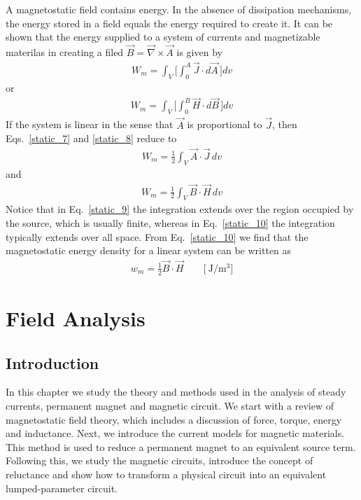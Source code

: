 \documentclass[11pt,a4paper,oneside]{book}
\numberwithin{equation}{section}
\theoremstyle{it}
\theoremstyle{definition}
\begin{document}
A magnetostatic field contains energy. In the absence of dissipation mechanisms, the energy stored in a field equals the energy required to create it. It can be shown that the energy supplied to a system of currents and magnetizable materilas in creating a filed $\vec{B}=\vec{\nabla}\times\vec{A}$ is given by 
 \begin{equation}\label{static_7}
 	\begin{aligned}
		W_m =\int_{V}\Bigg[\int_{0}^{A}\vec{J}\cdot d\vec{A}\,\Bigg]dv
 	\end{aligned}
 \end{equation} 
or
 \begin{equation}\label{static_8}
	\begin{aligned}
		W_m =\int_{V}\Bigg[\int_{0}^{B}\vec{H}\cdot d\vec{B}\,\Bigg]dv
	\end{aligned}
\end{equation} 
If the system is linear in the sense that $\vec{A}$ is proportional to $\vec{J}$, then Eqs.~\eqref{static_7} and \ref{static_8} reduce to
 \begin{equation}\label{static_9}
	\begin{aligned}
		W_m =\frac{1}{2}\int_{V}\vec{A}\cdot \vec{J}\,dv
	\end{aligned}
\end{equation} 
and
 \begin{equation}\label{static_10}
	\begin{aligned}
		W_m =\frac{1}{2}\int_{V}\vec{B}\cdot \vec{H}\,dv
	\end{aligned}
\end{equation} 
Notice that in Eq.~\eqref{static_9} the integration extends over the region occupied by the source, which is usually finite, whereas in Eq.~\eqref{static_10} the integration typically extends over all space. From Eq.~\eqref{static_10} we find that the magnetostatic energy density for a linear system can be written as
\begin{equation}\label{static_11}
	\begin{aligned}
		w_m =\frac{1}{2}\vec{B}\cdot \vec{H}\qquad\Big[\SI{}{\joule\per\cubic\meter}\Big]
	\end{aligned}
\end{equation} 

\chapter{Field Analysis}
\section{Introduction}
In this chapter we study the theory and methods used in the analysis of steady currents, permanent magnet and magnetic circuit. We start with a review of magnetostatic field theory, which includes a discussion of force, torque, energy  and inductance. Next, we introduce the current models for magnetic materials. This method is used to reduce a permanent magnet to an equivalent source term. Following this, we study the magnetic circuits, introduce the concept of reluctance and show how to transform a physical circuit into an equivalent lumped-parameter circuit. 
\end{document}
